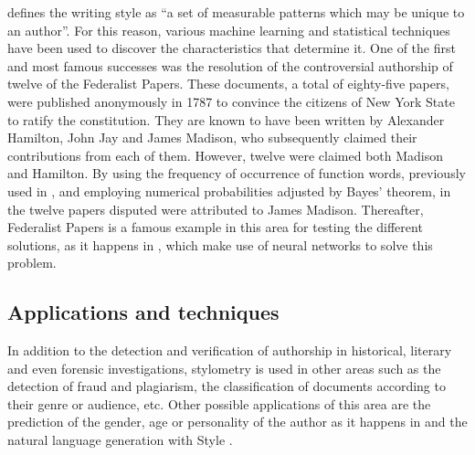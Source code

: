 \cite{neuronalstylometry} defines the writing style as ``a set of measurable patterns which may be unique to an author''. For this reason, various machine learning and statistical techniques have been used to discover the characteristics that determine it. One of the first and most famous successes was the resolution of the controversial authorship of twelve of the Federalist Papers. These documents, a total of eighty-five papers, were published anonymously in 1787 to convince the citizens of New York State to ratify the constitution. They are known to have been written by Alexander Hamilton, John Jay and James Madison, who subsequently claimed their contributions from each of them. However, twelve were claimed both Madison and Hamilton. By using the frequency of occurrence of function words, previously used in \cite{juniusletters}, and employing numerical probabilities adjusted by Bayes' theorem, in \cite{federalistpapers} the twelve papers disputed were attributed to James Madison. Thereafter, Federalist Papers is a famous example in this area for testing the different solutions, as it happens in \cite{neuronalstylometry}, which make use of neural networks to solve this problem.

\subsection{Applications and techniques}\label{ssect:techstylo}
In addition to the detection and verification of authorship in historical, literary and even forensic investigations, stylometry is used in other areas such as the detection of fraud and plagiarism, the classification of documents according to their genre or audience, etc. Other possible applications of this area are the prediction of the gender, age or personality of the author as it happens in \cite{schwartz2013personality} and the natural language generation with Style \citep[Section 5.1]{nlgsoa}.

